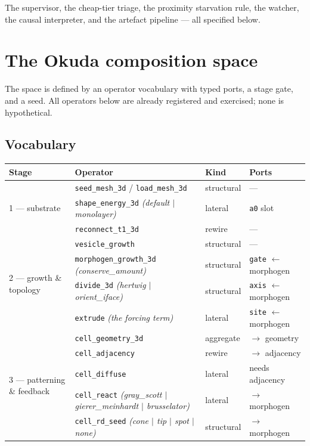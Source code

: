 \documentclass[11pt]{article}
\newcommand{\code}[1]{\texttt{#1}}
\newcommand{\op}[1]{\textcolor{cop}{\texttt{#1}}}
\begin{document}
The supervisor, the cheap-tier triage, the proximity starvation rule, the watcher, the causal
interpreter, and the artefact pipeline --- all specified below.

\section{The Okuda composition space}
\label{sec:space}

The space is defined by an operator vocabulary with typed ports, a stage gate, and a seed. All
operators below are already registered and exercised; none is hypothetical.

\subsection{Vocabulary}

\begin{center}\small
\begin{tabular}{@{}llll@{}}
\toprule
\textbf{Stage} & \textbf{Operator} & \textbf{Kind} & \textbf{Ports} \\
\midrule
\multirow{3}{*}{1 --- substrate}
 & \op{seed\_mesh\_3d} / \op{load\_mesh\_3d} & structural & --- \\
 & \op{shape\_energy\_3d} \emph{(default $\mid$ monolayer)} & lateral & \code{a0} slot \\
 & \op{reconnect\_t1\_3d} & rewire & --- \\
\midrule
\multirow{4}{*}{2 --- growth \& topology}
 & \op{vesicle\_growth} & structural & --- \\
 & \op{morphogen\_growth\_3d} \emph{(conserve\_amount)} & structural & \code{gate} $\leftarrow$ morphogen \\
 & \op{divide\_3d} \emph{(hertwig $\mid$ orient\_iface)} & structural & \code{axis} $\leftarrow$ morphogen \\
 & \op{extrude} \emph{(the forcing term)} & lateral & \code{site} $\leftarrow$ morphogen \\
\midrule
\multirow{5}{*}{3 --- patterning \& feedback}
 & \op{cell\_geometry\_3d} & aggregate & $\rightarrow$ geometry \\
 & \op{cell\_adjacency} & rewire & $\rightarrow$ adjacency \\
 & \op{cell\_diffuse} & lateral & needs adjacency \\
 & \op{cell\_react} \emph{(gray\_scott $\mid$ gierer\_meinhardt $\mid$ brusselator)} & lateral & $\rightarrow$ morphogen \\
 & \op{cell\_rd\_seed} \emph{(cone $\mid$ tip $\mid$ spot $\mid$ none)} & structural & $\rightarrow$ morphogen \\
\bottomrule
\end{tabular}
\end{center}
\end{document}
